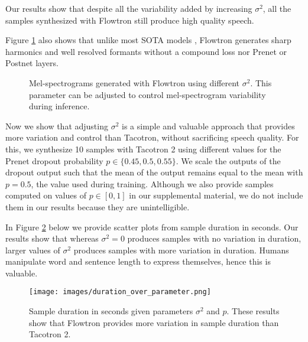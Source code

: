\documentclass{article}
\begin{document}
Our results show that despite all the variability added by increasing $\sigma^2$, all the samples synthesized with Flowtron still produce high quality speech.

Figure \ref{fig:mel_quality} also shows that unlike most SOTA models \cite{shen2017natural,arik2017deep,arik2017deep2,ping2017deep,skerry2018towards, wang2018style,binkowski2019high}, Flowtron generates sharp harmonics and well resolved formants without a compound loss nor Prenet or Postnet layers.

\begin{figure}[!ht]
    \centering
    
    
    \caption{Mel-spectrograms generated with Flowtron using different $\sigma^2$. This parameter can be adjusted to control mel-spectrogram variability during inference.}
    \label{fig:mel_quality}
\end{figure}

Now we show that adjusting $\sigma^2$ is a simple and valuable approach that provides more variation and control than Tacotron, without sacrificing speech quality. For this, we synthesize 10 samples with Tacotron 2 using different values for the Prenet dropout probability $p \in \{0.45, 0.5, 0.55\}$. We scale the outputs of the dropout output such that the mean of the output remains equal to the mean with $p=0.5$, the value used during training. Although we also provide samples computed on values of $p \in [0, 1]$ in our supplemental material, we do not include them in our results because they are unintelligible.

In Figure \ref{fig:sentence_durations} below we provide scatter plots from sample duration in seconds. Our results show that whereas  $\sigma^2=0$ produces samples with no variation in duration, larger values of $\sigma^2$ produces samples with more variation in duration. Humans manipulate word and sentence length to express themselves, hence this is valuable.

\begin{figure}[!ht]
    \centering
    \texttt{[image: images/duration\_over\_parameter.png]}
    \caption{Sample duration in seconds given parameters $\sigma^2$ and $p$. These results show that Flowtron provides more variation in sample duration than Tacotron 2.}
    \label{fig:sentence_durations}
\end{figure}
\end{document}
